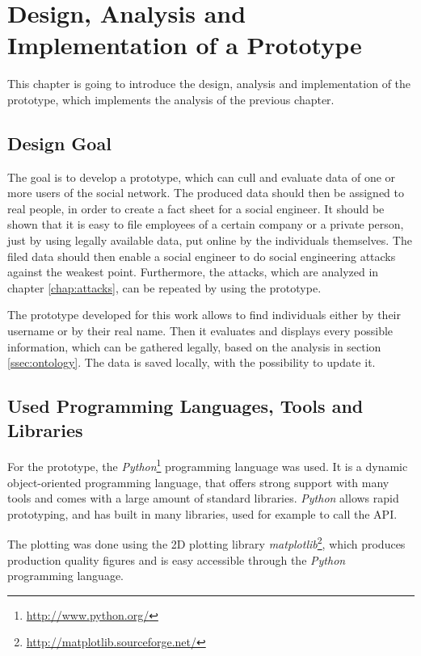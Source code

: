 \chapter{Design, Analysis and Implementation of a Prototype}
\label{chap:prototype}

This chapter is going to introduce the design, analysis and implementation of
the prototype, which implements the analysis of the previous chapter.

\section{Design Goal}

The goal is to develop a prototype, which can cull and evaluate data of one or
more users of the \Twitter{} social network. The produced data should then be
assigned to real people, in order to create a fact sheet for a social engineer.
It should be shown that it is easy to file employees of a certain company or a
private person, just by using legally available data, put online by the
individuals themselves. The filed data should then enable a social engineer to
do social engineering attacks against the weakest point. Furthermore, the
attacks, which are analyzed in chapter \ref{chap:attacks}, can be repeated by
using the prototype.

The prototype developed for this work allows to find individuals either by
their username or by their real name. Then it evaluates and displays every
possible information, which can be gathered legally, based on the analysis in
section \ref{ssec:ontology}. The data is saved locally, with the possibility to
update it.

\section{Used Programming Languages, Tools and Libraries}

For the prototype, the \textit{Python}\footnote{\url{http://www.python.org/}}
programming language was used. It is a dynamic object-oriented programming
language, that offers strong support with many tools and comes with a large
amount of standard libraries. \textit{Python} allows rapid prototyping, and has
built in many libraries, used for example to call the \Twitter{} API.

The plotting was done using the 2D plotting library
\textit{matplotlib}\footnote{\url{http://matplotlib.sourceforge.net/}}, which
produces production quality figures and is easy accessible through the
\textit{Python} programming language.

